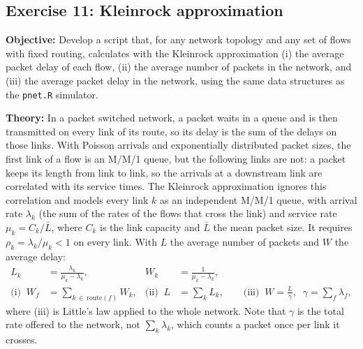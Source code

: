 ﻿\documentclass[12pt]{article}
\begin{document}
\subsection{Exercise 11: Kleinrock approximation}

\textbf{Objective:} Develop a script that, for any network topology and any
set of flows with fixed routing, calculates with the Kleinrock approximation
(i) the average packet delay of each flow, (ii) the average number of packets
in the network, and (iii) the average packet delay in the network, using the
same data structures as the \texttt{pnet.R} simulator.

\textbf{Theory:} In a packet switched network, a packet waits in a queue and
is then transmitted on every link of its route, so its delay is the sum of the
delays on those links. With Poisson arrivals and exponentially distributed
packet sizes, the first link of a flow is an M/M/1 queue, but the following
links are not: a packet keeps its length from link to link, so the arrivals at
a downstream link are correlated with its service times. The Kleinrock
approximation ignores this correlation and models every link $k$ as an
independent M/M/1 queue, with arrival rate $\lambda_k$ (the sum of the rates
of the flows that cross the link) and service rate $\mu_k=C_k/\bar{L}$, where
$C_k$ is the link capacity and $\bar{L}$ the mean packet size. It requires
$\rho_k=\lambda_k/\mu_k<1$ on every link. With $L$ the average number of
packets and $W$ the average delay:
\begin{align*}
    L_k &= \frac{\lambda_k}{\mu_k-\lambda_k}, &
    W_k &= \frac{1}{\mu_k-\lambda_k}, \\
    \text{(i)}\;\; W_f &= \sum_{k\,\in\,\text{route}(f)} W_k, &
    \text{(ii)}\;\; L &= \sum_k L_k, \qquad
    \text{(iii)}\;\; W = \frac{L}{\gamma},\;\; \gamma=\sum_f \lambda_f ,
\end{align*}
where (iii) is Little's law applied to the whole network. Note that $\gamma$
is the total rate offered to the network, not $\sum_k\lambda_k$, which counts
a packet once per link it crosses.
\end{document}

